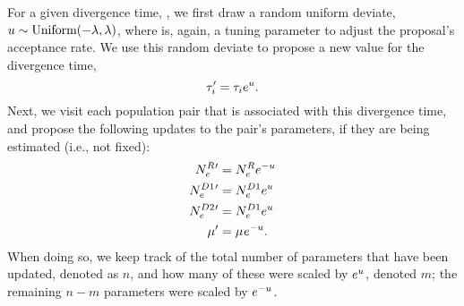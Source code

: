 \begin{linenomath}
For a given divergence time, \divtime[i],
we first draw a random uniform deviate,
$\uniformdeviate \sim \textrm{Uniform}(-\tuningparameter, \tuningparameter)$,
where \tuningparameter is, again, a tuning parameter to adjust the proposal's
acceptance rate.
We use this random deviate to propose a new value for the divergence time,
\[
    \divtime[i]\proposed = \divtime[i] e^{\uniformdeviate}.
\]
Next, we visit each population pair that is associated with this
divergence time, and propose the following updates to the
pair's parameters, if they are being estimated (i.e., not fixed):
\begin{equation}
    \begin{split}
        \epopsize[\rootpopindex]{}\proposed & = \epopsize[\rootpopindex]{} e^{-\uniformdeviate} \\
        \epopsize[\descendantpopindex{1}]{}\proposed & = \epopsize[\descendantpopindex{1}]{} e^{\uniformdeviate} \\
        \epopsize[\descendantpopindex{2}]{}\proposed & = \epopsize[\descendantpopindex{1}]{} e^{\uniformdeviate} \\
        \murate\proposed & = \murate e^{-\uniformdeviate}.
    \end{split}
\end{equation}
When doing so, we keep track of the total number of parameters
that have been updated, denoted as $n$,
and how many of these were scaled by
$e^{\uniformdeviate}$, denoted $m$;
the remaining $n-m$ parameters were scaled by $e^{-\uniformdeviate}$.
\end{linenomath}

